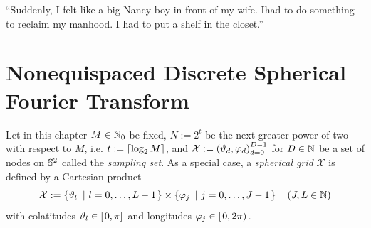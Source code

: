\begin{savequote}[8cm]
  ``Suddenly, I felt like a big Nancy-boy in front of my wife. Ihad to do something to reclaim my manhood. I had to put a shelf in the closet.''
\end{savequote}
\makeatletter
\chapter{Nonequispaced Discrete Spherical Fourier Transform}
\label{DSFT}

Let in this chapter $M \in \mathbb{N}_{0}$ be fixed, $N := 2^t$ be the 
next greater power of two with respect to $M$, i.e. $t := {\left\lceil\log_2 M\right\rceil}$, and $\mathcal{X} := \left(\vartheta_d,\varphi_d\right)_{d=0}^{D-1}$ for $D \in \mathbb{N}$ be
a set of nodes on $\mathbb{S}^2$ called the \emph{sampling set}. As a special case, a \emph{spherical grid} 
$\mathcal{X}$ is defined by a Cartesian product 
$$
  \mathcal{X} := \left\{\vartheta_{l}\ \left|\ l=0,\ldots,L-1\right.\right\rbrace \times \left\{\varphi_{j}\ \left|\ j=0,\ldots,J-1\right.\right\rbrace \quad \left(J,L \in \mathbb{N}\right)
$$
with colatitudes $\vartheta_{l} \in \left[\left.0,\pi\right]\right.$ and longitudes $\varphi_{j} \in \left[\left.0,2\pi\right)\right.$.

